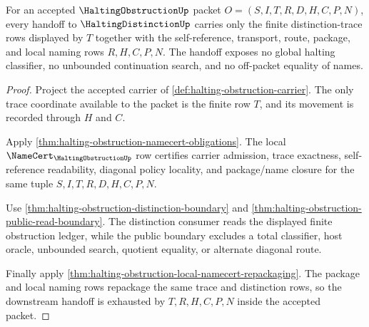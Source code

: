 \begin{theorem}
\label{thm:halting-obstruction-distinction-trace-handoff}
For an accepted $\HaltingObstructionUp$ packet $O=(S,I,T,R,D,H,C,P,N)$, every handoff to $\HaltingDistinctionUp$ carries only the finite distinction-trace rows displayed by $T$ together with the self-reference, transport, route, package, and local naming rows $R,H,C,P,N$. The handoff exposes no global halting classifier, no unbounded continuation search, and no off-packet equality of names.
\end{theorem}
\begin{proof}
Project the accepted carrier of \autoref{def:halting-obstruction-carrier}. The only trace coordinate available to the packet is the finite row $T$, and its movement is recorded through $H$ and $C$.

Apply \autoref{thm:halting-obstruction-namecert-obligations}. The local $\NameCert_{\HaltingObstructionUp}$ row certifies carrier admission, trace exactness, self-reference readability, diagonal policy locality, and package/name closure for the same tuple $S,I,T,R,D,H,C,P,N$.

Use \autoref{thm:halting-obstruction-distinction-boundary} and \autoref{thm:halting-obstruction-public-read-boundary}. The distinction consumer reads the displayed finite obstruction ledger, while the public boundary excludes a total classifier, host oracle, unbounded search, quotient equality, or alternate diagonal route.

Finally apply \autoref{thm:halting-obstruction-local-namecert-repackaging}. The package and local naming rows repackage the same trace and distinction rows, so the downstream handoff is exhausted by $T,R,H,C,P,N$ inside the accepted packet.
\end{proof}

